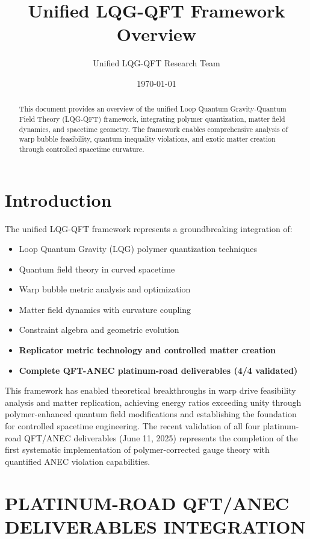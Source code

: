 \documentclass[11pt]{article}
\title{Unified LQG-QFT Framework Overview}
\author{Unified LQG-QFT Research Team}
\date{\today}
\begin{document}
\maketitle

\begin{abstract}
This document provides an overview of the unified Loop Quantum Gravity-Quantum Field Theory (LQG-QFT) framework, integrating polymer quantization, matter field dynamics, and spacetime geometry. The framework enables comprehensive analysis of warp bubble feasibility, quantum inequality violations, and exotic matter creation through controlled spacetime curvature.
\end{abstract}

\tableofcontents
\newpage

\section{Introduction}

The unified LQG-QFT framework represents a groundbreaking integration of:
\begin{itemize}
\item Loop Quantum Gravity (LQG) polymer quantization techniques
\item Quantum field theory in curved spacetime
\item Warp bubble metric analysis and optimization
\item Matter field dynamics with curvature coupling
\item Constraint algebra and geometric evolution
\item \textbf{Replicator metric technology and controlled matter creation}
\item \textbf{Complete QFT-ANEC platinum-road deliverables (4/4 validated)}
\end{itemize}

This framework has enabled theoretical breakthroughs in warp drive feasibility analysis and matter replication, achieving energy ratios exceeding unity through polymer-enhanced quantum field modifications and establishing the foundation for controlled spacetime engineering. The recent validation of all four platinum-road QFT/ANEC deliverables (June 11, 2025) represents the completion of the first systematic implementation of polymer-corrected gauge theory with quantified ANEC violation capabilities.

\section{PLATINUM-ROAD QFT/ANEC DELIVERABLES INTEGRATION}
\end{document}
